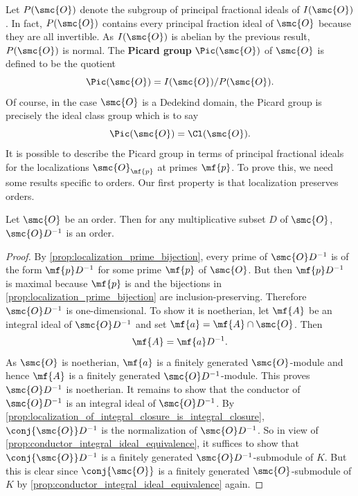     Let \(P(\smc{O})\) denote the subgroup of principal fractional ideals of \(I(\smc{O})\). In fact, \(P(\smc{O})\) contains every principal fraction ideal of \(\smc{O}\) because they are all invertible. As \(I(\smc{O})\) is abelian by the previous result, \(P(\smc{O})\) is normal. The \textbf{Picard group} \(\Pic(\smc{O})\) of \(\smc{O}\) is defined to be the quotient
    \[
      \Pic(\smc{O}) = I(\smc{O})/P(\smc{O}).
    \]
    Of course, in the case \(\smc{O}\) is a Dedekind domain, the Picard group is precisely the ideal class group which is to say
    \[
      \Pic(\smc{O}) = \Cl(\smc{O}).
    \]
    It is possible to describe the Picard group in terms of principal fractional ideals for the localizations \(\smc{O}_{\mf{p}}\) at primes \(\mf{p}\). To prove this, we need some results specific to orders. Our first property is that localization preserves orders.

    \begin{proposition}\label{prop:localization_preserves_orders}
      Let \(\smc{O}\) be an order. Then for any multiplicative subset \(D\) of \(\smc{O}\), \(\smc{O}D^{-1}\) is an order.
    \end{proposition}
    \begin{proof}
      By \cref{prop:localization_prime_bijection}, every prime of \(\smc{O}D^{-1}\) is of the form \(\mf{p}D^{-1}\) for some prime \(\mf{p}\) of \(\smc{O}\). But then \(\mf{p}D^{-1}\) is maximal because \(\mf{p}\) is and the bijections in \cref{prop:localization_prime_bijection} are inclusion-preserving. Therefore \(\smc{O}D^{-1}\) is one-dimensional. To show it is noetherian, let \(\mf{A}\) be an integral ideal of \(\smc{O}D^{-1}\) and set \(\mf{a} = \mf{A} \cap \smc{O}\). Then
      \[
        \mf{A} = \mf{a}D^{-1}.
      \]
      As \(\smc{O}\) is noetherian, \(\mf{a}\) is a finitely generated \(\smc{O}\)-module and hence \(\mf{A}\) is a finitely generated \(\smc{O}D^{-1}\)-module. This proves \(\smc{O}D^{-1}\) is noetherian. It remains to show that the conductor of \(\smc{O}D^{-1}\) is an integral ideal of \(\smc{O}D^{-1}\). By \cref{prop:localization_of_integral_closure_is_integral_closure}, \(\conj{\smc{O}}D^{-1}\) is the normalization of \(\smc{O}D^{-1}\). So in view of \cref{prop:conductor_integral_ideal_equivalence}, it suffices to show that \(\conj{\smc{O}}D^{-1}\) is a finitely generated \(\smc{O}D^{-1}\)-submodule of \(K\). But this is clear since \(\conj{\smc{O}}\) is a finitely generated \(\smc{O}\)-submodule of \(K\) by \cref{prop:conductor_integral_ideal_equivalence} again.
    \end{proof}
    
